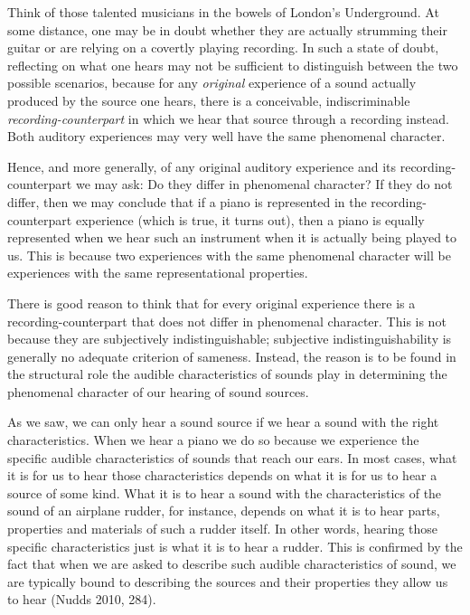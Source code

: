 \documentclass[sloppy, journal, git, anonymise]{humapap}
\begin{document}
Think of those talented musicians in the bowels of London's Underground.
At some distance, one may be in doubt whether they are actually
strumming their guitar or are relying on a covertly playing recording.
In such a state of doubt, reflecting on what one hears may not be
sufficient to distinguish between the two possible scenarios, because
for any \emph{original} experience of a sound actually produced by the
source one hears, there is a conceivable, indiscriminable
\emph{recording-counterpart} in which we hear that source through a
recording instead. Both auditory experiences may very well have the same
phenomenal character.

Hence, and more generally, of any original auditory experience and its
recording-counterpart we may ask: Do they differ in phenomenal
character? If they do not differ, then we may conclude that if a piano
is represented in the recording-counterpart experience (which is true,
it turns out), then a piano is equally represented when we hear such an
instrument when it is actually being played to us. This is because two
experiences with the same phenomenal character will be experiences with
the same representational properties.

There is good reason to think that for every original experience there
is a recording-counterpart that does not differ in phenomenal character.
This is not because they are subjectively indistinguishable; subjective
indistinguishability is generally no adequate criterion of sameness.
Instead, the reason is to be found in the structural role the audible
characteristics of sounds play in determining the phenomenal character
of our hearing of sound sources.

As we saw, we can only hear a sound source if we hear a sound with the
right characteristics. When we hear a piano we do so because we
experience the specific audible characteristics of sounds that reach our
ears. In most cases, what it is for us to hear those characteristics
depends on what it is for us to hear a source of some kind. What it is
to hear a sound with the characteristics of the sound of an airplane
rudder, for instance, depends on what it is to hear parts, properties
and materials of such a rudder itself. In other words, hearing those
specific characteristics just is what it is to hear a rudder. This is
confirmed by the fact that when we are asked to describe such audible
characteristics of sound, we are typically bound to describing the
sources and their properties they allow us to hear (Nudds 2010, 284).
\end{document}
